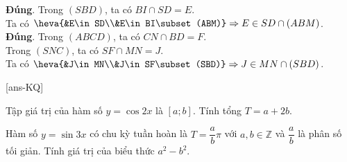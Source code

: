 \begin{ex}
{\begin{itemchoice}
			\itemch \textbf{Đúng}. Trong $(SBD)$, ta có $BI\cap SD = E$.\\
			Ta có $\heva{&E\in SD\\&E\in BI\subset(ABM)} \Rightarrow E\in SD\cap(ABM)$.\\
			\itemch \textbf{Đúng}. Trong $(ABCD)$, ta có $CN\cap BD = F$.\\
			Trong $(SNC)$, ta có $SF\cap MN = J$.\\
			Ta có $\heva{&J\in MN\\&J\in SF\subset(SBD)} \Rightarrow J\in MN\cap(SBD)$.
		\end{itemchoice}
	}
\end{ex}				



\caukq

[ans-KQ]

\begin{ex}%
	Tập giá trị của hàm số $y = \cos 2x$ là $[a;b]$. Tính tổng $T = a + 2b$.
\end{ex}

\begin{ex}%
	Hàm số $y = \sin 3x$ có chu kỳ tuần hoàn là $T = \dfrac{a}{b} \pi$ với $a, b \in \mathbb{Z}$ và $\dfrac{a}{b}$ là phân số tối giản. Tính giá trị của biểu thức $a^2 - b^2$.
\end{ex}


